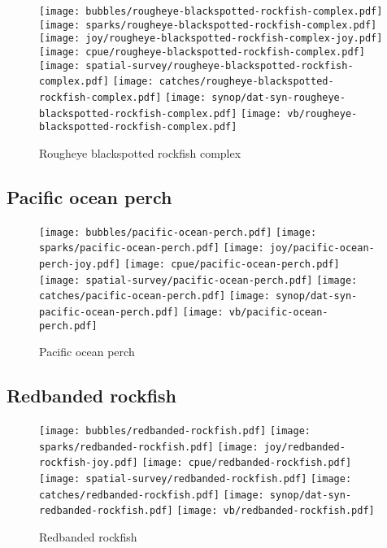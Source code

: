 \begin{figure}[htbp]
\centering
\texttt{[image: bubbles/rougheye-blackspotted-rockfish-complex.pdf]}
\texttt{[image: sparks/rougheye-blackspotted-rockfish-complex.pdf]}
\texttt{[image: joy/rougheye-blackspotted-rockfish-complex-joy.pdf]}
\texttt{[image: cpue/rougheye-blackspotted-rockfish-complex.pdf]}
\texttt{[image: spatial-survey/rougheye-blackspotted-rockfish-complex.pdf]}
\texttt{[image: catches/rougheye-blackspotted-rockfish-complex.pdf]}
\texttt{[image: synop/dat-syn-rougheye-blackspotted-rockfish-complex.pdf]}
\texttt{[image: vb/rougheye-blackspotted-rockfish-complex.pdf]}
\caption{Rougheye blackspotted rockfish complex}
\end{figure}
\clearpage
\subsection*{Pacific ocean perch}

\begin{figure}[htbp]
\centering
\texttt{[image: bubbles/pacific-ocean-perch.pdf]}
\texttt{[image: sparks/pacific-ocean-perch.pdf]}
\texttt{[image: joy/pacific-ocean-perch-joy.pdf]}
\texttt{[image: cpue/pacific-ocean-perch.pdf]}
\texttt{[image: spatial-survey/pacific-ocean-perch.pdf]}
\texttt{[image: catches/pacific-ocean-perch.pdf]}
\texttt{[image: synop/dat-syn-pacific-ocean-perch.pdf]}
\texttt{[image: vb/pacific-ocean-perch.pdf]}
\caption{Pacific ocean perch}
\end{figure}
\clearpage
\subsection*{Redbanded rockfish}

\begin{figure}[htbp]
\centering
\texttt{[image: bubbles/redbanded-rockfish.pdf]}
\texttt{[image: sparks/redbanded-rockfish.pdf]}
\texttt{[image: joy/redbanded-rockfish-joy.pdf]}
\texttt{[image: cpue/redbanded-rockfish.pdf]}
\texttt{[image: spatial-survey/redbanded-rockfish.pdf]}
\texttt{[image: catches/redbanded-rockfish.pdf]}
\texttt{[image: synop/dat-syn-redbanded-rockfish.pdf]}
\texttt{[image: vb/redbanded-rockfish.pdf]}
\caption{Redbanded rockfish}
\end{figure}
\clearpage
